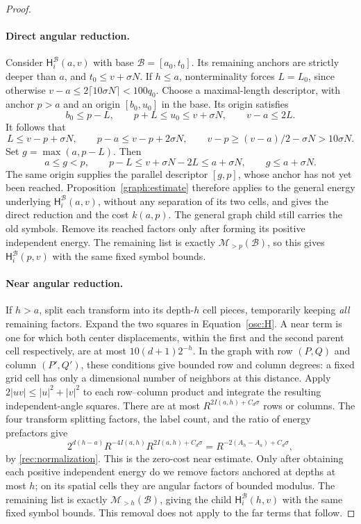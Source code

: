 \begin{proof}
\paragraph{Direct angular reduction.}
Consider \(\mathsf H_i^{\mathcal B}(a,v)\) with base
\(\mathcal B=[a_0,t_0]\).  Its remaining
anchors are strictly deeper than \(a\), and
\(t_0\le v+\sigma N\).  If \(h\le a\), nonterminality forces
\(L=L_0\), since otherwise
\(v-a\le2\lceil10\sigma N\rceil<100q_0\).
Choose a maximal-length descriptor, with anchor \(p>a\) and an
origin \([b_0,u_0]\) in the base.  Its origin satisfies
\[
 b_0\le p-L,\qquad p+L\le u_0\le v+\sigma N,
 \qquad v-a\le2L.
\]
It follows that
\[
 L\le v-p+\sigma N,\qquad
 p-a\le v-p+2\sigma N,\qquad
 v-p\ge(v-a)/2-\sigma N>10\sigma N.
\]
Set \(g=\max(a,p-L)\).  Then
\[
 a\le g<p,\qquad
 p-L\le v+\sigma N-2L\le a+\sigma N,
 \qquad g\le a+\sigma N.
\]
The same origin supplies the parallel descriptor \([g,p]\), whose
anchor has not yet been reached.  Proposition~\ref{graph:estimate}
therefore applies to the general energy underlying
\(\mathsf H_i^{\mathcal B}(a,v)\), without any separation of its two
cells, and gives the direct reduction and the cost \(k(a,p)\).
The general graph child still carries the old symbols.  Remove its
reached factors only after forming its positive independent energy.  The
remaining list is exactly \(\mathcal M_{>p}(\mathcal B)\), so this gives
\(\mathsf H_i^{\mathcal B}(p,v)\) with the same fixed symbol bounds.

\paragraph{Near angular reduction.}
If \(h>a\), split each transform into its depth-\(h\) cell pieces,
temporarily keeping \emph{all} remaining factors.  Expand the two
squares in Equation~\eqref{osc:H}.  A near term is one for
which both center displacements, within the first and the second
parent cell respectively, are at most \(10(d+1)2^{-h}\).
In the graph with row \((P,Q)\) and column \((P',Q')\), these
conditions give bounded row and column degrees: a fixed grid cell has
only a dimensional number of neighbors at this distance.  Apply
\(2|uv|\le|u|^2+|v|^2\) to each row--column product and integrate
the resulting independent-angle squares.  There are at most
\(R^{2I(a,h)+C_d\sigma}\) rows or columns.  The four transform
splitting factors, the label count, and the ratio of energy
prefactors give
\[
 2^{d(h-a)}R^{-4I(a,h)}R^{2I(a,h)+C_d\sigma}
 =R^{-2(A_h-A_a)+C_d\sigma},
\]
by \eqref{rec:normalization}.  This is the zero-cost near estimate.
Only after obtaining each positive independent energy do we remove factors
anchored at depths at most \(h\); on its spatial cells they are angular
factors of bounded modulus.  The remaining list is exactly
\(\mathcal M_{>h}(\mathcal B)\), giving the child
\(\mathsf H_i^{\mathcal B}(h,v)\) with the same fixed symbol bounds.
This removal does not apply to the far terms that follow.


\end{proof}

